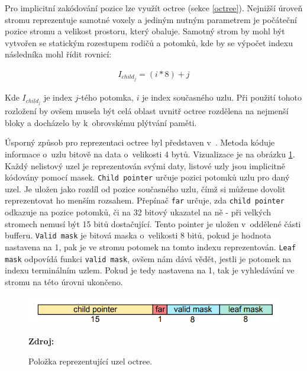 Pro implicitní zakódování pozice lze využít octree (sekce \ref{octree}). Nejnižší úroveň stromu reprezentuje samotné voxely a jediným nutným parametrem je počáteční pozice stromu a velikost prostoru, který obaluje. Samotný strom by mohl být vytvořen se statickým rozestupem rodičů a potomků, kde by se výpočet indexu následníka mohl řídit rovnicí:

\begin{equation} \label{eq:simple_octree_index}
	\begin{gathered}
		I_{child_j} = (i * 8) + j
	\end{gathered}
\end{equation}

Kde $I_{child_j}$ je index $j$-tého potomka, $i$ je index současného uzlu. Při použití tohoto rozložení by ovšem musela být celá oblast uvnitř octree rozdělena na nejmenší bloky a docházelo by k~obrovskému plýtvání paměti.

Úsporný způsob pro reprezentaci octree byl představen v~\cite{Laine2011EfficientSV}. Metoda kóduje informace o~uzlu bitově na data o~velikosti 4 bytů. Vizualizace je na obrázku \ref{fig:octree_child}. Každý nelistový uzel je reprezentován svými daty, listové uzly jsou implicitně kódovány pomocí masek. \texttt{Child pointer} určuje pozici potomků uzlu pro daný uzel. Je uložen jako rozdíl od pozice současného uzlu, čímž si můžeme dovolit reprezentovat ho menším rozsahem. Přepínač \texttt{far} určuje, zda \texttt{child pointer} odkazuje na pozice potomků, či na 32 bitový ukazatel na ně - při velkých stromech nemusí být 15 bitů dostačující. Tento pointer je uložen v~oddělené části bufferu. \texttt{Valid mask} je bitová maska o~velikosti 8 bitů, pokud je hodnota nastavena na 1, pak je ve stromu potomek na tomto indexu reprezentován. \texttt{Leaf mask} odpovídá funkci \texttt{valid mask}, ovšem nám dává vědět, jestli je potomek na indexu terminálním uzlem. Pokud je tedy nastavena na 1, tak je vyhledávání ve stromu na této úrovni ukončeno.

\begin{figure}[H]
	\centering
	\includegraphics[scale=1.3]{obrazky-figures/octree_child_data.png}
	\caption{Položka reprezentující uzel octree.}
	\textbf{Zdroj: \cite{Laine2011EfficientSV}}
	\label{fig:octree_child}
\end{figure}

